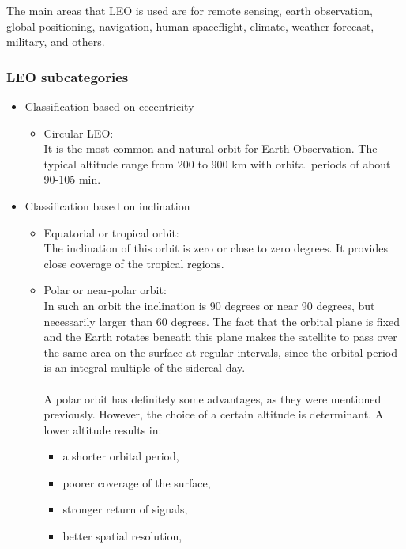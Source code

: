 The main areas that LEO is used are for remote sensing, earth observation, global positioning, navigation, human spaceflight, climate, weather forecast, military, and others. 

\pagebreak
\subsubsection{LEO subcategories}
\bigskip

\begin{itemize}
\item Classification based on eccentricity
	\begin{itemize}
	\item Circular LEO: \\
	It is the most common and natural orbit for Earth Observation. The typical altitude range from 200 to 900 km with orbital periods of about 90-105 min.
	\end{itemize}
\item Classification based on inclination
	\begin{itemize}
	\item Equatorial or tropical orbit: \\
	The inclination of this orbit is zero or close to zero degrees. It provides close coverage of the tropical regions.
	\item Polar or near-polar orbit: \\
	In such an orbit the inclination is 90 degrees or near 90 degrees, but necessarily larger than 60 degrees. The fact that the orbital plane is fixed and the Earth rotates beneath this plane makes the satellite to pass over the same area on the surface at regular intervals, since the orbital period is an integral multiple of the sidereal day. \cite{Campbell} \\ %
	\\
	A polar orbit has definitely some advantages, as they were mentioned previously. However, the choice of a certain altitude is determinant. A lower altitude results in:
		\begin{itemize}
		\item a shorter orbital period,
		\item poorer coverage of the surface,
		\item stronger return of signals,
		\item better spatial resolution,

\end{itemize}
\end{itemize}
\end{itemize}
